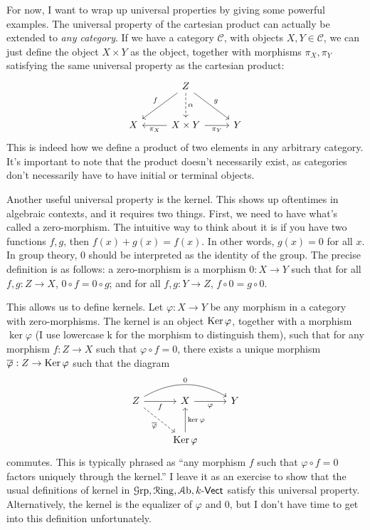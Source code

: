 For now, I want to wrap up universal properties by giving some powerful examples. The universal property of the cartesian product can actually be extended to \emph{any category}. If we have a category $\mathcal{C} $, with objects $X,Y\in \mathcal{C} $, we can just define the object $X\times Y$ as the object, together with morphisms $\pi_X,\pi _Y$ satisfying the same universal property as the cartesian product:
\[\begin{tikzcd}[row sep = 2.5em, column sep = 2.5em]
 & Z\ar[" f "', dl] \ar[" g ", dr] \ar[" \alpha  ", dashed, d]  &  \\
X & X\times Y\ar["\pi _X", l] \ar["\pi _Y"', r]  & Y
\end{tikzcd}\]
This is indeed how we define a product of two elements in any arbitrary category. It's important to note that the product doesn't necessarily exist, as categories don't necessarily have to have initial or terminal objects.

Another useful universal property is the kernel. This shows up oftentimes in algebraic contexts, and it requires two things. First, we need to have what's called a zero-morphism. The intuitive way to think about it is if you have two functions $f,g$, then $f(x)+g(x)=f(x)$. In other words, $g(x)=0$ for all $x$. In group theory, $0$ should be interpreted as the identity of the group. The precise definition is as follows: a zero-morphism is a morphism $0: X \to Y$ such that for all $f,g : Z \to X$, $0\circ f=0\circ g$; and for all $f,g : Y \to Z$, $f\circ 0=g\circ 0$.

This allows us to define kernels. Let $\varphi  : X \to Y$ be any morphism in a category with zero-morphisms. The kernel is an object $\operatorname{Ker} \varphi  $, together with a morphism $\ker \varphi $ (I use lowercase k for the morphism to distinguish them), such that for any morphism $f : Z \to X$ such that $\varphi \circ f =0$, there exists a unique morphism $\overline{\varphi } : Z \to \operatorname{Ker} \varphi $ such that the diagram
\[\begin{tikzcd}[row sep = 2.5em, column sep = 2.5em]
Z\ar[bend left, " 0 ", rr] \ar[" f  "', r] \ar[dashed, " \overline{\varphi }  "', dr]  & X\ar[" \varphi "', r]  & Y \\
 & \Ker\varphi \ar[" \ker \varphi  "', u]  & 
\end{tikzcd}\]
commutes. This is typically phrased as ``any morphism $f$ such that $\varphi \circ f=0$ factors uniquely through the kernel.'' I leave it as an exercise to show that the usual definitions of kernel in $\mathcal{G}\mathrm{rp} ,\mathcal{R}\mathrm{ing} ,\mathcal{A} \mathrm{b} ,k\text{-}\mathsf{Vect} $ satisfy this universal property. Alternatively, the kernel is the equalizer of $\varphi $ and 0, but I don't have time to get into this definition unfortunately.

